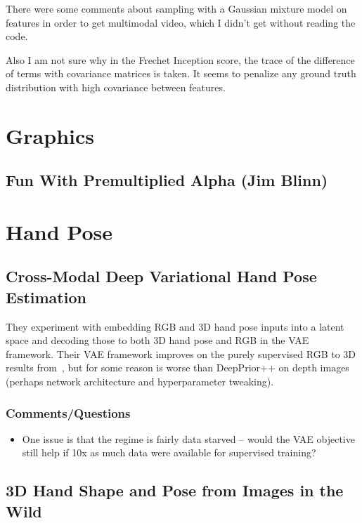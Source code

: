 \documentclass[a4paper, 12pt]{article}
\begin{document}
There were some comments about sampling with a Gaussian mixture model on
features in order to get multimodal video, which I didn't get without reading
the code.

Also I am not sure why in the Frechet Inception score, the trace of the
difference of terms with covariance matrices is taken. It seems to penalize any
ground truth distribution with high covariance between features.


\section{Graphics}


\subsection{Fun With Premultiplied Alpha (Jim Blinn)}


\section{Hand Pose}


\subsection{Cross-Modal Deep Variational Hand Pose
            Estimation~\cite{spurr2018crossmodal}}

They experiment with embedding RGB and 3D hand pose inputs into a latent space
and decoding those to both 3D hand pose and RGB in the VAE framework. Their VAE
framework improves on the purely supervised RGB to 3D results
from~\cite{zb2017hand}, but for some reason is worse than DeepPrior++ on depth
images (perhaps network architecture and hyperparameter tweaking).


\subsubsection{Comments/Questions}

\begin{itemize}
        \item One issue is that the regime is fairly data starved -- would the
                VAE objective still help if 10x as much data were available for
                supervised training?
\end{itemize}


\subsection{3D Hand Shape and Pose from Images in the
            Wild~\cite{boukhayma20193d}}
\end{document}
